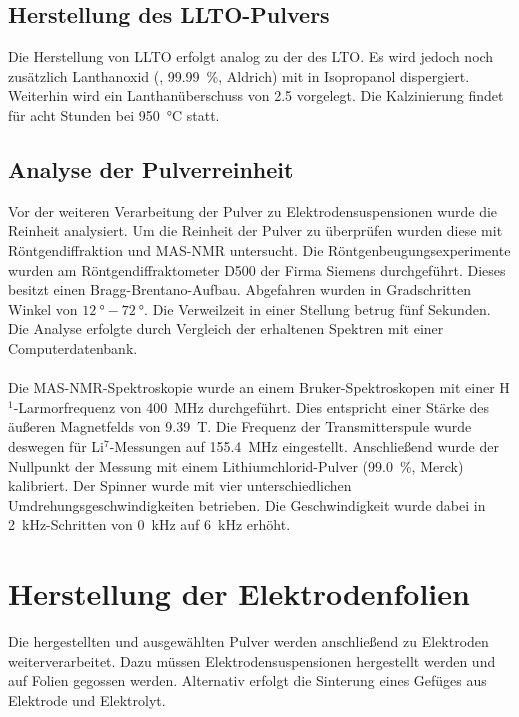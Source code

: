 \documentclass[a4paper, 11pt, headsepline,footsepline,twoside,abstract]{scrbook}
\begin{document}
\subsection{Herstellung des LLTO-Pulvers}
\label{praep_LLTO}
Die Herstellung von LLTO erfolgt analog zu der des LTO. Es wird jedoch noch zusätzlich Lanthanoxid (, \SI{99.99}{\percent}, Aldrich) mit in Isopropanol dispergiert. Weiterhin wird ein Lanthanüberschuss von \SI{2.5}{\masspercent} vorgelegt. Die Kalzinierung findet für acht Stunden bei \SI{950}{\celsius} statt.
\subsection{Analyse der Pulverreinheit}
\label{methode_analyse_pulver}
Vor der weiteren Verarbeitung der Pulver zu Elektrodensuspensionen wurde die Reinheit analysiert. Um die Reinheit der Pulver zu überprüfen wurden diese mit Röntgendiffraktion und MAS-NMR untersucht. Die Röntgenbeugungsexperimente wurden am Röntgendiffraktometer D500 der Firma Siemens durchgeführt. Dieses besitzt einen Bragg-Brentano-Aufbau. Abgefahren wurden in Gradschritten Winkel von $\SI{12}{\degree} - \SI{72}{\degree}$. Die Verweilzeit in einer Stellung betrug fünf Sekunden. Die Analyse erfolgte durch Vergleich der erhaltenen Spektren mit einer Computerdatenbank.
\\\\
Die MAS-NMR-Spektroskopie wurde an einem Bruker-Spektroskopen mit einer H$^1$-Larmor\-frequenz von \SI{400}{\mega\hertz} durchgeführt. Dies entspricht einer Stärke des äußeren Magnetfelds von \SI{9.39}{\tesla}. Die Frequenz der Transmitterspule wurde deswegen für Li$^7$-Messungen auf \SI{155.4}{\mega\hertz} eingestellt. Anschließend wurde der Nullpunkt der Messung mit einem Lithiumchlorid-Pulver (\SI{99.0}{\percent}, Merck) kalibriert. Der Spinner wurde mit vier unterschiedlichen Umdrehungsgeschwindigkeiten betrieben. Die Geschwindigkeit wurde dabei in \SI{2}{\kilo\hertz}-Schritten von \SI{0}{\kilo\hertz} auf \SI{6}{\kilo\hertz} erhöht.
\section{Herstellung der Elektrodenfolien}
Die hergestellten und ausgewählten Pulver werden anschließend zu Elektroden weiterverarbeitet. Dazu müssen Elektrodensuspensionen hergestellt werden und auf Folien gegossen werden. Alternativ erfolgt die Sinterung eines Gefüges aus Elektrode und Elektrolyt.
\end{document}
